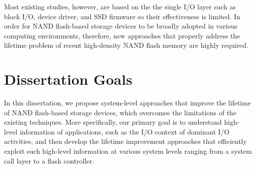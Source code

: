 Most existing studies, however, are based on the the single I/O layer such as 
block I/O, device driver, and SSD firmware so their effectiveness is limited.
In order for NAND flash-based storage devices to be broadly adopted in
various computing environments, therefore,
new approaches that properly address the lifetime problem of recent
high-density NAND flash memory are highly required.

\section{Dissertation Goals}
In this dissertation, we propose system-level approaches that improve 
the lifetime of NAND flash-based storage devices, which overcomes the limitations
of the existing techniques. More specifically, our primary goal is to understand 
high-level information of applications, such as the 
I/O context of dominant I/O activities,
and then develop the lifetime improvement approaches that efficiently exploit such
high-level information at various system levels ranging from a system call layer 
to a flash controller.

